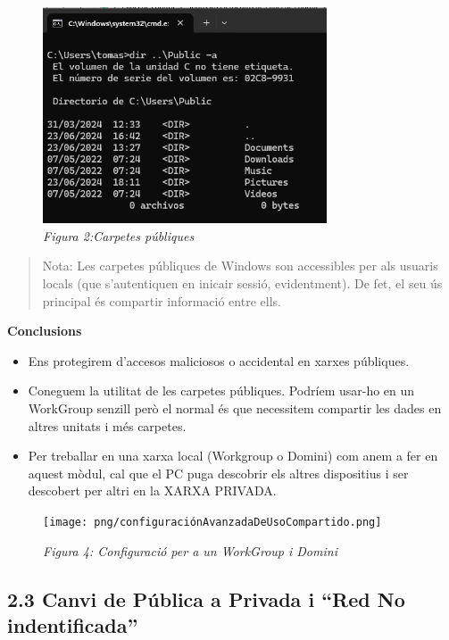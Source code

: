 \documentclass[
  a4paper,
]{article}
\providecommand{\tightlist}{%
  \setlength{\itemsep}{0pt}\setlength{\parskip}{0pt}}
\begin{document}
\begin{figure}
\centering
\includegraphics[width=0.75\textwidth,height=\textheight]{png/CarpetaPublic.png}
\caption{\emph{Figura 2:Carpetes públiques}}
\end{figure}

\begin{quote}
Nota: Les carpetes públiques de Windows son accessibles per als usuaris
locals (que s'autentiquen en inicair sessió, evidentment). De fet, el
seu ús principal és compartir informació entre ells.
\end{quote}

\textbf{Conclusions}

\begin{itemize}
\tightlist
\item
  Ens protegirem d'accesos maliciosos o accidental en xarxes públiques.
\item
  Coneguem la utilitat de les carpetes públiques. Podríem usar-ho en un
  WorkGroup senzill però el normal és que necessitem compartir les dades
  en altres unitats i més carpetes.
\item
  Per treballar en una xarxa local (Workgroup o Domini) com anem a fer
  en aquest mòdul, cal que el PC puga descobrir els altres dispositius i
  ser descobert per altri en la XARXA PRIVADA.
\end{itemize}

\begin{figure}
\centering
\texttt{[image: png/configuraciónAvanzadaDeUsoCompartido.png]}
\caption{\emph{Figura 4: Configuració per a un WorkGroup i Domini}}
\end{figure}

\subsection{2.3 Canvi de Pública a Privada i ``Red No
indentificada''}\label{canvi-de-puxfablica-a-privada-i-red-no-indentificada}
\end{document}
